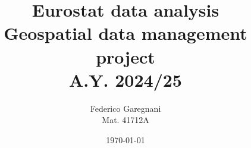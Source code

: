 \documentclass[headinclude]{scrartcl}
\title{
Eurostat data analysis\\
\large{Geospatial data management project}\\
\large{A.Y. 2024/25}
}
\author{Federico Garegnani\\Mat. 41712A}
\date{\today}
\begin{document}
	
	\maketitle
	
	\tableofcontents
	\pagebreak
	
	
	
	
	
	
\end{document}
